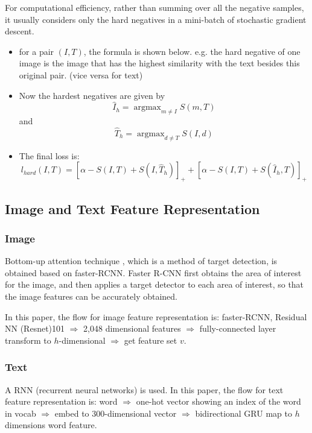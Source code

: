 For computational efficiency, rather than summing over all the negative samples, it usually considers only the hard negatives in a mini-batch of stochastic gradient descent.

\begin{itemize}
    \item for a pair $(I, T)$, the formula is shown below. e.g. the hard negative of one image is the image that has the highest similarity with the text besides this original pair. (vice versa for text)
    \item Now the hardest negatives are given by $$\hat{I}_{h}=\operatorname{argmax}_{m \neq I} S(m, T)$$ and $$\hat{T}_{h}=\operatorname{argmax}_{d \neq T} S(I, d)$$
    \item The final loss is: 
    $$l_{h a r d}(I, T)=\left[\alpha-S(I, T)+S\left(I, \hat{T}_{h}\right)\right]_{+}+\left[\alpha-S(I, T)+S\left(\hat{I}_{h}, T\right)\right]_{+}$$
\end{itemize}

\subsection{Image and Text Feature Representation}

\subsubsection{Image}Bottom-up attention technique \cite{bottomup}, which is a method of target detection, is obtained based on faster-RCNN. Faster R-CNN first obtains the area of interest for the image, and then applies a target detector to each area of interest, so that the image features can be accurately obtained.

In this paper, the flow for image feature representation is: faster-RCNN, Residual NN (Resnet)101 $\Rightarrow$ 2,048 dimensional features $\Rightarrow$ fully-connected layer transform to $h$-dimensional $\Rightarrow$ get feature set $v$.

\subsubsection{Text}A RNN (recurrent neural networks) is used. In this paper, the flow for text feature representation is: word $\Rightarrow$ one-hot vector showing an index of the word in vocab $\Rightarrow$ embed to 300-dimensional vector $\Rightarrow$ bidirectional GRU map to $h$ dimensions word feature.

